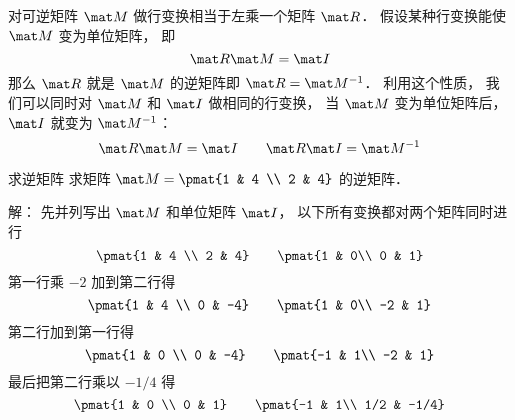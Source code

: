 
\begin{issues}
\issueDraft
\end{issues}


对可逆矩阵 $\mat M$ 做行变换相当于左乘一个矩阵 $\mat R$． 假设某种行变换能使 $\mat M$ 变为单位矩阵， 即
\begin{equation}
\mat R \mat M = \mat I
\end{equation}
那么 $\mat R$ 就是 $\mat M$ 的逆矩阵即 $\mat R = \mat M^{-1}$． 利用这个性质， 我们可以同时对 $\mat M$ 和 $\mat I$ 做相同的行变换， 当 $\mat M$ 变为单位矩阵后， $\mat I$ 就变为 $\mat M^{-1}$：
\begin{equation}
\mat R\mat M = \mat I
\qquad
\mat R \mat I = \mat M^{-1}
\end{equation}

\begin{example}{求逆矩阵}
求矩阵 $\mat M = \pmat{1 & 4 \\ 2 & 4}$ 的逆矩阵．

解： 先并列写出 $\mat M$ 和单位矩阵 $\mat I$， 以下所有变换都对两个矩阵同时进行
\begin{equation}
\pmat{1 & 4 \\ 2 & 4} \qquad \pmat{1 & 0\\ 0 & 1}
\end{equation}
第一行乘 $-2$ 加到第二行得
\begin{equation}
\pmat{1 & 4 \\ 0 & -4} \qquad \pmat{1 & 0\\ -2 & 1}
\end{equation}
第二行加到第一行得
\begin{equation}
\pmat{1 & 0 \\ 0 & -4} \qquad \pmat{-1 & 1\\ -2 & 1}
\end{equation}
最后把第二行乘以 $-1/4$ 得
\begin{equation}
\pmat{1 & 0 \\ 0 & 1} \qquad \pmat{-1 & 1\\ 1/2 & -1/4}
\end{equation}
\end{example}

